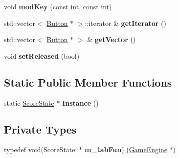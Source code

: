 \begin{DoxyCompactItemize}
\item 
\hypertarget{class_score_state_a5ba36c848a5cc0cf42c530c61c7c08e2}{}void {\bfseries mod\+Key} (const int, const int)\label{class_score_state_a5ba36c848a5cc0cf42c530c61c7c08e2}

\item 
\hypertarget{class_score_state_ae6776dab3d6d2806a5c900d218b1c0ba}{}std\+::vector$<$ \hyperlink{class_button}{Button} $\ast$ $>$\+::iterator \& {\bfseries get\+Iterator} ()\label{class_score_state_ae6776dab3d6d2806a5c900d218b1c0ba}

\item 
\hypertarget{class_score_state_ae675eeb23b98ad8a1b9c8a030bb2850a}{}std\+::vector$<$ \hyperlink{class_button}{Button} $\ast$ $>$ \& {\bfseries get\+Vector} ()\label{class_score_state_ae675eeb23b98ad8a1b9c8a030bb2850a}

\item 
\hypertarget{class_score_state_af0037d5636c4ba3d33563abe560d3aa3}{}void {\bfseries set\+Released} (bool)\label{class_score_state_af0037d5636c4ba3d33563abe560d3aa3}

\end{DoxyCompactItemize}
\subsection*{Static Public Member Functions}
\begin{DoxyCompactItemize}
\item 
\hypertarget{class_score_state_a4ddbeb51b5be5f2a9d55819edddf639e}{}static \hyperlink{class_score_state}{Score\+State} $\ast$ {\bfseries Instance} ()\label{class_score_state_a4ddbeb51b5be5f2a9d55819edddf639e}

\end{DoxyCompactItemize}
\subsection*{Private Types}
\begin{DoxyCompactItemize}
\item 
\hypertarget{class_score_state_a587f2de36c7bdcf617736f2e677240b3}{}typedef void(Score\+State\+::$\ast$ {\bfseries m\+\_\+tab\+Fun}) (\hyperlink{class_game_engine}{Game\+Engine} $\ast$)\label{class_score_state_a587f2de36c7bdcf617736f2e677240b3}

\end{DoxyCompactItemize}
